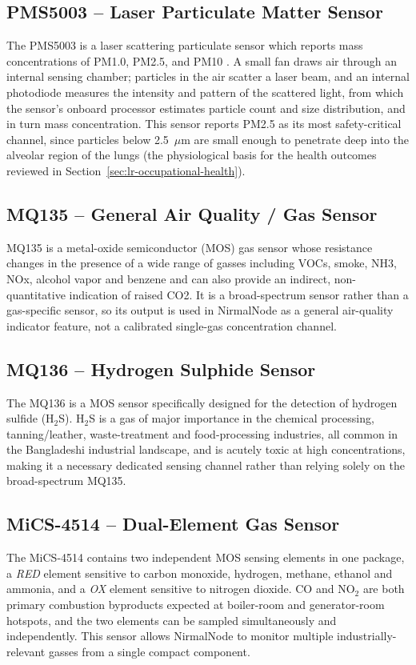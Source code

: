 \subsection{PMS5003 -- Laser Particulate Matter Sensor}
The PMS5003 is a laser scattering particulate sensor which reports mass concentrations of PM1.0, PM2.5, and PM10 . A small fan draws air through an internal sensing chamber; particles in the air scatter a laser beam, and an internal photodiode measures the intensity and pattern of the scattered light, from which the sensor's onboard processor estimates particle count and size distribution, and in turn mass concentration. This sensor reports PM2.5 as its most safety-critical channel, since particles below 2.5~$\mu$m are small enough to penetrate deep into the alveolar region of the lungs (the physiological basis for the health outcomes reviewed in Section~\ref{sec:lr-occupational-health}).

\subsection{MQ135 -- General Air Quality / Gas Sensor}
MQ135 is a metal-oxide semiconductor (MOS) gas sensor whose resistance changes in the presence of a wide range of gasses including VOCs, smoke, NH3, NOx, alcohol vapor and benzene and can also provide an indirect, non-quantitative indication of raised CO2. It is a broad-spectrum sensor rather than a gas-specific sensor, so its output is used in NirmalNode as a general air-quality indicator feature, not a calibrated single-gas concentration channel.

\subsection{MQ136 -- Hydrogen Sulphide Sensor}
The MQ136 is a MOS sensor specifically designed for the detection of hydrogen sulfide (H$_2$S). H$_2$S is a gas of major importance in the chemical processing, tanning/leather, waste-treatment and food-processing industries, all common in the Bangladeshi industrial landscape, and is acutely toxic at high concentrations, making it a necessary dedicated sensing channel rather than relying solely on the broad-spectrum MQ135.

\subsection{MiCS-4514 -- Dual-Element Gas Sensor}
The MiCS-4514 contains two independent MOS sensing elements in one package, a \emph{RED} element sensitive to carbon monoxide, hydrogen, methane, ethanol and ammonia, and a \emph{OX} element sensitive to nitrogen dioxide. CO and NO$_2$ are both primary combustion byproducts expected at boiler-room and generator-room hotspots, and the two elements can be sampled simultaneously and independently. This sensor allows NirmalNode to monitor multiple industrially-relevant gasses from a single compact component.


